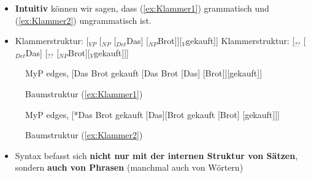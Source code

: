 \begin{frame}

\begin{itemize}

	\item \textbf{Intuitiv} können wir sagen, dass (\ref{ex:Klammer1}) grammatisch und (\ref{ex:Klammer2}) ungrammatisch ist.
	\item[]
	\eal
	\ex \label{ex:Klammer1}Klammerstruktur: [$_{VP}$ [$_{NP}$ [$_{Det}$Das] [$_{NP}$Brot]][$_{V}$gekauft]]
	\ex \label{ex:Klammer2}Klammerstruktur: [$_{??}$ [$_{Det}$Das] [$_{??}$ [$_{NP}$Brot][$_{V}$gekauft]]]
	\zl

\end{itemize}


\begin{figure}[b]
	\begin{minipage}[b]{0.05\textwidth}
	\end{minipage} 
	\begin{minipage}[b]{0.40\textwidth}
	\centering
	\scriptsize{
		\begin{forest}
		MyP edges,
		[Das Brot gekauft [Das Brot [Das] [Brot]][gekauft]]
		\end{forest}
		}
		\caption{Baumstruktur (\ref{ex:Klammer1})}	
  	\end{minipage}  
	\begin{minipage}[b]{0.05\textwidth}
  	\end{minipage}
  	\begin{minipage}[b]{0.40\textwidth}
	\centering
	\scriptsize{
		\begin{forest}
		MyP edges,
		[*Das Brot gekauft [Das][Brot gekauft [Brot] [gekauft]]]
		\end{forest}
		}
		\caption{Baumstruktur (\ref{ex:Klammer2})}
  	\end{minipage}  
	\begin{minipage}[b]{0.05\textwidth}
  	\end{minipage}
  	
\end{figure}

\begin{itemize}
	\item Syntax befasst sich \textbf{nicht nur mit der internen Struktur von Sätzen}, sondern \textbf{auch von Phrasen} (manchmal auch von Wörtern)
\end{itemize}
\end{frame}


